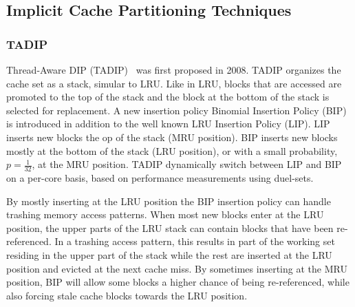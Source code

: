 




\subsection{Implicit Cache Partitioning Techniques}

\subsubsection{TADIP}
Thread-Aware DIP (TADIP)~\cite{Jaleel2008} was first proposed in 2008.
TADIP organizes the cache set as a stack, simular to LRU.
Like in LRU, blocks that are accessed are promoted to the top of the stack and the block at the bottom of the stack is selected for replacement.
A new insertion policy Binomial Insertion Policy (BIP) is introduced in addition to the well known LRU Insertion Policy (LIP).
LIP inserts new blocks the op of the stack (MRU position).
BIP inserts new blocks mostly at the bottom of the stack (LRU position), or with a small probability, $p = \frac{1}{32}$, at the MRU position.
TADIP dynamically switch between LIP and BIP on a per-core basis, based on performance measurements using duel-sets.

By mostly inserting at the LRU position the BIP insertion policy can handle trashing memory access patterns.
When most new blocks enter at the LRU position, the upper parts of the LRU stack can contain blocks that have been re-referenced.
In a trashing access pattern, this results in part of the working set residing in the upper part of the stack while the rest are inserted at the LRU position and evicted at the next cache miss.
By sometimes inserting at the MRU position, BIP will allow some blocks a higher chance of being re-referenced, while also forcing stale cache blocks towards the LRU position. 

